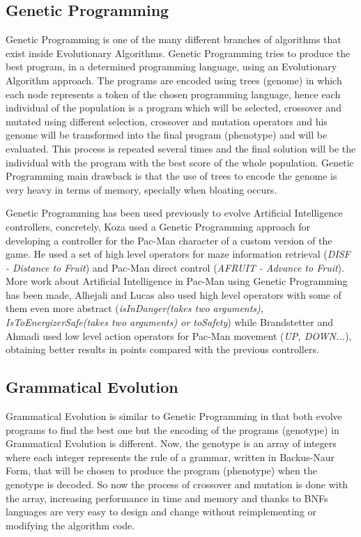 \documentclass{llncs}
\begin{document}
\subsection{Genetic Programming}
Genetic Programming is one of the many different branches of algorithms that exist inside Evolutionary Algorithms. \cite{poli_langdon_mcphee_koza_2008}
Genetic Programming tries to produce the best program, in a determined programming language, using an Evolutionary Algorithm approach. The programs are encoded using trees (genome)  in which each node represents a token of the chosen programming language, hence each individual of the population is a program which will be selected, crossover and mutated using different selection, crossover and mutation operators and his genome will be transformed into the final program (phenotype) and will be evaluated. This process is repeated several times and the final solution will be the individual with the program with the best score of the whole population.\cite{cervigon}
Genetic Programming main drawback is that the use of trees to encode the genome is very heavy in terms of memory, specially when bloating occurs.\cite{Poli2003}

Genetic Programming has been used previously to evolve Artificial Intelligence controllers, concretely, Koza\cite{koza1992genetic} used a Genetic Programming approach for developing a controller for the Pac-Man character of a custom version of the game. He used a set of high level operators for maze information retrieval (\textit{DISF - Distance to Fruit}) and Pac-Man direct control (\textit{AFRUIT - Advance to Fruit}).
More work about Artificial Intelligence in Pac-Man using Genetic Programming has been made, Alhejali and Lucas\cite{alhejali_lucas_2010}
also used high level operators with some of them even more abstract (\textit{isInDanger(takes two arguments), IsToEnergizerSafe(takes two arguments) or toSafety}) while Brandstetter and Ahmadi\cite{brandstetter_ahmadi_2012}
used low level action operators for Pac-Man movement (\textit{UP, DOWN...}), obtaining better results in points compared with the previous controllers.
\subsection{Grammatical Evolution}
Grammatical Evolution is similar to Genetic Programming in that both evolve programs to find the best one but the encoding of the programs (genotype) in Grammatical Evolution is different. Now, the genotype is an array of integers where each integer represents the rule of a grammar, written in Backus-Naur Form,
that will be chosen to produce the program (phenotype) when the genotype is decoded. So now the process of crossover and mutation is done with the array, increasing performance in time and memory and thanks to BNFs languages are very easy to design and change without reimplementing or modifying the algorithm code.\cite{o'neill_ryan_2012}
\end{document}
